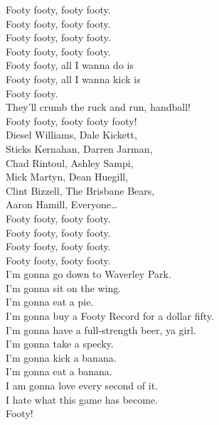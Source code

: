 Footy footy, footy footy. \\
Footy footy, footy footy. \\
Footy footy, footy footy. \\
Footy footy, footy footy. \\

Footy footy, all I wanna do is \\
Footy footy, all I wanna kick is \\
Footy footy. \\
They’ll crumb the ruck and run, handball! \\
Footy footy, footy footy footy! \\

Diesel Williams, Dale Kickett, \\
Sticks Kernahan, Darren Jarman, \\
Chad Rintoul, Ashley Sampi, \\
Mick Martyn, Dean Huegill, \\
Clint Bizzell, The Brisbane Bears, \\
Aaron Hamill, Everyone… \\

Footy footy, footy footy. \\
Footy footy, footy footy. \\
Footy footy, footy footy. \\
Footy footy, footy footy. \\

I'm gonna go down to Waverley Park. \\
I'm gonna sit on the wing. \\
I'm gonna eat a pie. \\
I'm gonna buy a Footy Record for a dollar fifty. \\
I'm gonna have a full-strength beer, ya girl. \\
I'm gonna take a specky. \\
I'm gonna kick a banana. \\
I'm gonna eat a banana. \\
I am gonna love every second of it. \\
I hate what this game has become. \\

Footy! \\
